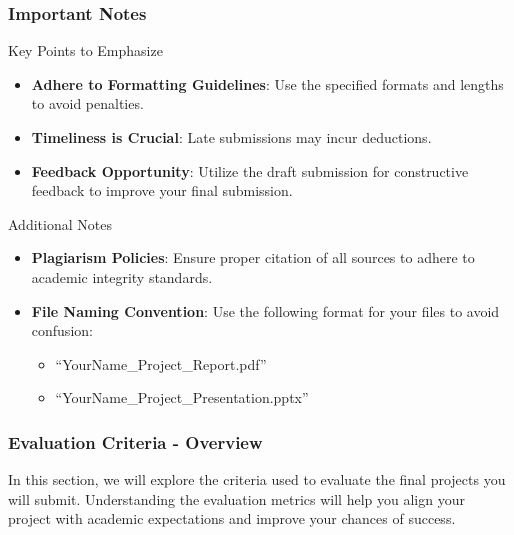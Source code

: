 \documentclass[aspectratio=169]{beamer}
\begin{document}
\begin{frame}[fragile]
    \frametitle{Important Notes}
    \begin{block}{Key Points to Emphasize}
        \begin{itemize}
            \item \textbf{Adhere to Formatting Guidelines}: Use the specified formats and lengths to avoid penalties.
            \item \textbf{Timeliness is Crucial}: Late submissions may incur deductions.
            \item \textbf{Feedback Opportunity}: Utilize the draft submission for constructive feedback to improve your final submission.
        \end{itemize}
    \end{block}

    \begin{block}{Additional Notes}
        \begin{itemize}
            \item \textbf{Plagiarism Policies}: Ensure proper citation of all sources to adhere to academic integrity standards.
            \item \textbf{File Naming Convention}: Use the following format for your files to avoid confusion:
            \begin{itemize}
                \item “YourName\_Project\_Report.pdf” 
                \item “YourName\_Project\_Presentation.pptx”
            \end{itemize}
        \end{itemize}
    \end{block}
\end{frame}

\begin{frame}[fragile]
  \frametitle{Evaluation Criteria - Overview}
  In this section, we will explore the criteria used to evaluate the final projects you will submit. 
  Understanding the evaluation metrics will help you align your project with academic expectations and 
  improve your chances of success.
\end{frame}
\end{document}
